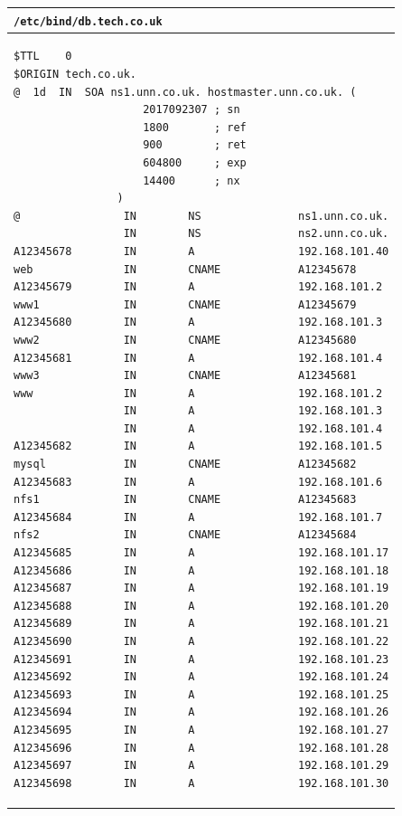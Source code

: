 \documentclass[11pt]{article}
\begin{document}
\begin{table}[ht]
    \begin{tabular}{|p{17.7cm}|} 
        \hline
        \texttt{\textbf{/etc/bind/db.tech.co.uk}}\\ 
        \hline
        \lstset{
                basicstyle=\scriptsize\ttfamily,
              }
              \begin{lstlisting}
$TTL    0 
$ORIGIN tech.co.uk.
@  1d  IN  SOA ns1.unn.co.uk. hostmaster.unn.co.uk. (
                    2017092307 ; sn
                    1800       ; ref
                    900        ; ret
                    604800     ; exp
                    14400      ; nx
                )
@                IN        NS               ns1.unn.co.uk.
                 IN        NS               ns2.unn.co.uk.
A12345678        IN        A                192.168.101.40
web              IN        CNAME            A12345678
A12345679        IN        A                192.168.101.2
www1             IN        CNAME            A12345679
A12345680        IN        A                192.168.101.3
www2             IN        CNAME            A12345680
A12345681        IN        A                192.168.101.4
www3             IN        CNAME            A12345681
www              IN        A                192.168.101.2
                 IN        A                192.168.101.3
                 IN        A                192.168.101.4
A12345682        IN        A                192.168.101.5
mysql            IN        CNAME            A12345682
A12345683        IN        A                192.168.101.6
nfs1             IN        CNAME            A12345683
A12345684        IN        A                192.168.101.7
nfs2             IN        CNAME            A12345684
A12345685        IN        A                192.168.101.17
A12345686        IN        A                192.168.101.18
A12345687        IN        A                192.168.101.19
A12345688        IN        A                192.168.101.20
A12345689        IN        A                192.168.101.21
A12345690        IN        A                192.168.101.22
A12345691        IN        A                192.168.101.23
A12345692        IN        A                192.168.101.24
A12345693        IN        A                192.168.101.25
A12345694        IN        A                192.168.101.26
A12345695        IN        A                192.168.101.27
A12345696        IN        A                192.168.101.28
A12345697        IN        A                192.168.101.29
A12345698        IN        A                192.168.101.30
        \end{lstlisting}\\
        \hline
    \end{tabular}
\end{table}
\end{document}
